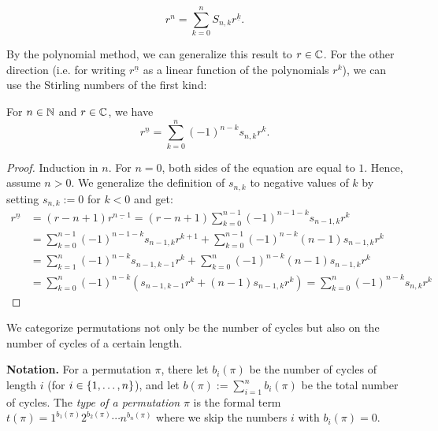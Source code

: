 \documentclass[language=english]{../../Template/TemplateLecture}
\begin{document}
\begin{equation}
    r^n = \sum_{k = 0}^n S_{n,k} r^{\underline{k}}.
\end{equation}

By the polynomial method, we can generalize this result to $r \in \mathbb{C}$. For the other direction (i.e. for writing $r^{\underline{n}}$ as a linear function of the polynomials $r^k$), we can use the Stirling numbers of the first kind:

\begin{prop}
    For $n \in \mathbb{N}$ and $r \in \mathbb{C}$, we have 
    \begin{equation}
        r^{\underline{n}} = \sum_{k = 0}^n (-1)^{n-k} s_{n,k} r^k.
    \end{equation}
\end{prop}

\begin{proof}
    Induction in $n$. For $n = 0$, both sides of the equation are equal to $1$. Hence, assume $n > 0$. We generalize the definition of $s_{n,k}$ to negative values of $k$ by setting $s_{n,k} := 0$ for $k < 0$ and get:
    \begin{equation}
        \begin{split}
            r^{\underline{n}} &= (r-n+1)r^{\underline{n-1}} = (r-n+1) \sum_{k = 0}^{n-1} (-1)^{n-1-k} s_{n-1,k} r^k \\
                            &= \sum_{k = 0}^{n-1} (-1)^{n-1-k} s_{n-1,k}r^{k+1} + \sum_{k = 0}^{n-1} (-1)^{n-k} (n-1)s_{n-1,k}r^k \\
                            &= \sum_{k = 1}^n (-1)^{n-k} s_{n-1,k-1}r^{k} + \sum_{k = 0}^n (-1)^{n-k} (n-1)s_{n-1,k}r^k \\
                            &= \sum_{k = 0}^n (-1)^{n-k} (s_{n-1,k-1}r^k + (n-1)s_{n-1,k}r^k) = \sum_{k = 0}^n (-1)^{n-k} s_{n,k}r^k
        \end{split}
    \end{equation}
\end{proof}

We categorize permutations not only be the number of cycles but also on the number of cycles of a certain length.

\textbf{Notation.} For a permutation $\pi$, there let $b_i(\pi)$ be the number of cycles of length $i$ (for $i \in \{1,\ldots,n\}$), and let $b(\pi) := \sum_{i = 1}^n b_i(\pi)$ be the total number of cycles. The \emph{type of a permutation} $\pi$ is the formal term $t(\pi) = 1^{b_1(\pi)}2^{b_2(\pi)}\cdots n^{b_n(\pi)}$ where we skip the numbers $i$ with $b_i(\pi) = 0$.
\end{document}
